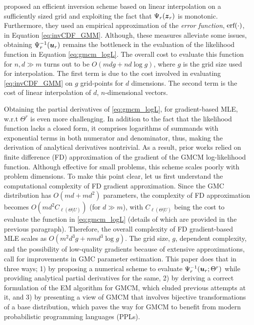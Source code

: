 \documentclass{article}
\theoremstyle{plain}
\theoremstyle{definition}
\theoremstyle{remark}
\begin{document}
\citet{Bilgrau2016} proposed an efficient inversion scheme based on linear interpolation on a sufficiently sized grid and exploiting the fact that $\Psi_r(\boldsymbol{z}_r)$ is monotonic. Furthermore, they used an empirical approximation of the \emph{error function}, $\textmd{erf}(\cdot)$, in Equation \ref{eq:invCDF_GMM}. Although, these measures alleviate some issues, obtaining $\Psi_r^{-1}(\boldsymbol{u}_r)$ remains the bottleneck in the evaluation of the likelihood function in Equation \eqref{eq:gmcm_logL}. The overall cost to evaluate this function for $n,d \gg m$ turns out to be $O(mdg + nd\log{g})$, where $g$ is the grid size used for interpolation. The first term is due to the cost involved in evaluating \eqref{eq:invCDF_GMM} on $g$ grid-points for $d$ dimensions. The second term is the cost of linear interpolation of $d$, $n$-dimensional vectors.  

Obtaining the partial derivatives of \eqref{eq:gmcm_logL}, for gradient-based MLE, w.r.t $\Theta^r$ is even more challenging. In addition to the fact that the likelihood function lacks a closed form, it comprises logarithms of summands with exponential terms in both numerator and denominator, thus, making the derivation of analytical derivatives nontrivial. As a result, prior works \citep{Tewari2011, Bilgrau2016} relied on finite difference (FD) approximation of the gradient of the GMCM log-likelihood function. Although effective for small problems, this scheme scales poorly with problem dimensions. To make this point clear, let us first understand the computational complexity of FD gradient approximation. Since the GMC distribution has $O(md+md^2)$ parameters, the complexity of FD approximation becomes $O(md^2C_{\ell(\Theta|U)})$ (for $d\gg m$), with $C_{\ell(\Theta|U)}$ being the cost to evaluate the function in  \eqref{eq:gmcm_logL} (details of which are provided in the previous paragraph).  Therefore, the overall complexity of FD gradient-based MLE scales as $O(m^2d^3g+nmd^3\log{g})$. The grid size, $g$, dependent complexity, and the possibility of low-quality gradients because of extensive approximations, call for improvements in GMC parameter estimation. This paper does that in three ways; 1) by proposing a numerical scheme to evaluate $\Psi_r^{-1}(\boldsymbol{u}_r;\Theta^r)$ while providing analytical partial derivatives for the same, 2) by deriving a correct formulation of the EM algorithm for GMCM, which eluded previous attempts at it, and 3) by presenting a view of GMCM that involves bijective transformations of a base distribution, which paves the way for GMCM to benefit from modern probabilistic programming languages (PPLs).
\end{document}
